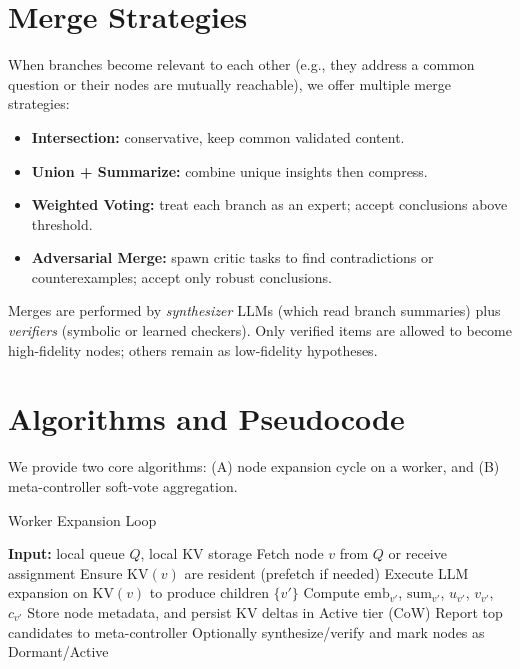 \documentclass[11pt,onecolumn,letterpaper]{article}
\begin{document}
\section{Merge Strategies}
When branches become relevant to each other (e.g., they address a common question or their nodes are mutually reachable), we offer multiple merge strategies:
\begin{itemize}[nosep]
  \item \textbf{Intersection:} conservative, keep common validated content.
  \item \textbf{Union + Summarize:} combine unique insights then compress.
  \item \textbf{Weighted Voting:} treat each branch as an expert; accept conclusions above threshold.
  \item \textbf{Adversarial Merge:} spawn critic tasks to find contradictions or counterexamples; accept only robust conclusions.
\end{itemize}

Merges are performed by \emph{synthesizer} LLMs (which read branch summaries) plus \emph{verifiers} (symbolic or learned checkers). Only verified items are allowed to become high-fidelity nodes; others remain as low-fidelity hypotheses.

\section{Algorithms and Pseudocode}
We provide two core algorithms: (A) node expansion cycle on a worker, and (B) meta-controller soft-vote aggregation.

\begin{algorithm}[H]
\caption{Worker Expansion Loop}
\label{alg:worker}
\begin{algorithmic}[1]
\State \textbf{Input:} local queue \(Q\), local KV storage
  \State Fetch node \(v\) from \(Q\) or receive assignment
  \State Ensure \(\text{KV}(v)\) are resident (prefetch if needed)
  \State Execute LLM expansion on \(\text{KV}(v)\) to produce children \(\{v'\}\)
    \State Compute \(\text{emb}_{v'}\), \(\text{sum}_{v'}\), \(u_{v'}\), \(v_{v'}\), \(c_{v'}\)
    \State Store node metadata, and persist KV deltas in Active tier (CoW)
    \State Report top candidates to meta-controller
  \EndFor
  \State Optionally synthesize/verify and mark nodes as Dormant/Active
\EndWhile
\end{algorithmic}
\end{algorithm}
\end{document}

